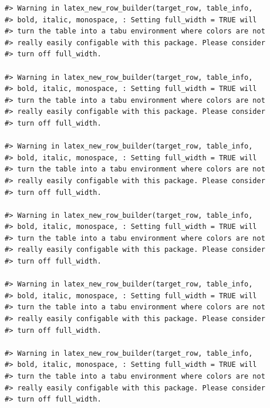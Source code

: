 \documentclass[
]{book}
\begin{document}
\begin{verbatim}
#> Warning in latex_new_row_builder(target_row, table_info,
#> bold, italic, monospace, : Setting full_width = TRUE will
#> turn the table into a tabu environment where colors are not
#> really easily configable with this package. Please consider
#> turn off full_width.

#> Warning in latex_new_row_builder(target_row, table_info,
#> bold, italic, monospace, : Setting full_width = TRUE will
#> turn the table into a tabu environment where colors are not
#> really easily configable with this package. Please consider
#> turn off full_width.

#> Warning in latex_new_row_builder(target_row, table_info,
#> bold, italic, monospace, : Setting full_width = TRUE will
#> turn the table into a tabu environment where colors are not
#> really easily configable with this package. Please consider
#> turn off full_width.

#> Warning in latex_new_row_builder(target_row, table_info,
#> bold, italic, monospace, : Setting full_width = TRUE will
#> turn the table into a tabu environment where colors are not
#> really easily configable with this package. Please consider
#> turn off full_width.

#> Warning in latex_new_row_builder(target_row, table_info,
#> bold, italic, monospace, : Setting full_width = TRUE will
#> turn the table into a tabu environment where colors are not
#> really easily configable with this package. Please consider
#> turn off full_width.

#> Warning in latex_new_row_builder(target_row, table_info,
#> bold, italic, monospace, : Setting full_width = TRUE will
#> turn the table into a tabu environment where colors are not
#> really easily configable with this package. Please consider
#> turn off full_width.
\end{verbatim}
\end{document}

